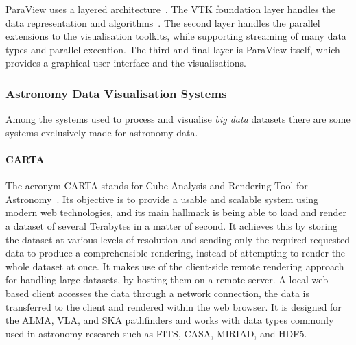 ParaView uses a layered architecture~\cite{Ahrens2005}.
The VTK foundation layer handles the data representation and algorithms~\cite{Ahrens2005}.
The second layer handles the parallel extensions to the visualisation toolkits, while supporting streaming of many data types and parallel execution.
The third and final layer is ParaView itself, which provides a graphical user interface and the visualisations.

\subsubsection{Astronomy Data Visualisation Systems}
Among the systems used to process and visualise \textit{big data} datasets there are some systems exclusively made for astronomy data.

\paragraph{CARTA}
The acronym CARTA stands for Cube Analysis and Rendering Tool for Astronomy~\cite{Comrie2021}.
Its objective is to provide a usable and scalable system using modern web technologies,
and its main hallmark is being able to load and render a dataset of several Terabytes in a matter of second.
It achieves this by storing the dataset at various levels of resolution and sending only the required requested data to produce a comprehensible rendering, instead of attempting to render the whole dataset at once.
It makes use of the client-side remote rendering approach for handling large datasets, by hosting them on a remote server.
A local web-based client accesses the data through a network connection, the data is transferred to the client and rendered within the web browser.
It is designed for the ALMA, VLA, and SKA pathfinders
and works with data types commonly used in astronomy research such as FITS, CASA, MIRIAD, and HDF5.

